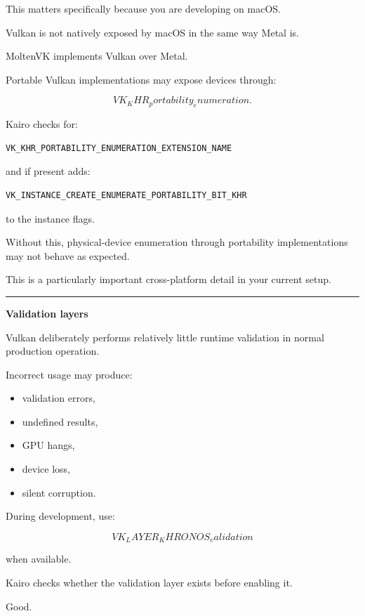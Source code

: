 This matters specifically because you are developing on macOS.

Vulkan is not natively exposed by macOS in the same way Metal is.

MoltenVK implements Vulkan over Metal.

Portable Vulkan implementations may expose devices through:

\[
VK_KHR_portability_enumeration.
\]

Kairo checks for:

\begin{verbatim}
VK_KHR_PORTABILITY_ENUMERATION_EXTENSION_NAME
\end{verbatim}

and if present adds:

\begin{verbatim}
VK_INSTANCE_CREATE_ENUMERATE_PORTABILITY_BIT_KHR
\end{verbatim}

to the instance flags.

Without this, physical-device enumeration through portability implementations may not behave as expected.

This is a particularly important cross-platform detail in your current setup.

\begin{center}\rule{0.5\linewidth}{0.5pt}\end{center}

\textbf{Validation layers}

Vulkan deliberately performs relatively little runtime validation in normal production operation.

Incorrect usage may produce:

\begin{itemize}
\tightlist
\item
  validation errors,
\item
  undefined results,
\item
  GPU hangs,
\item
  device loss,
\item
  silent corruption.
\end{itemize}

During development, use:

\[
\boxed{
VK_LAYER_KHRONOS_validation
}
\]

when available.

Kairo checks whether the validation layer exists before enabling it.

Good.


